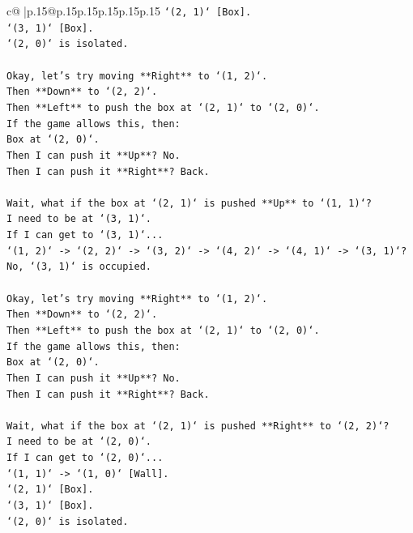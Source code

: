 \documentclass{article}
\begin{document}
{\begin{supertabular}{c@{$\;$}|p{.15\linewidth}@{}p{.15\linewidth}p{.15\linewidth}p{.15\linewidth}p{.15\linewidth}p{.15\linewidth}}
{{{\texttt{`(2, 1)` {[}Box{]}.} \\
\texttt{`(3, 1)` {[}Box{]}.} \\
\texttt{`(2, 0)` is isolated.} \\
\\ 
\texttt{Okay, let's try moving **Right** to `(1, 2)`.} \\
\texttt{Then **Down** to `(2, 2)`.} \\
\texttt{Then **Left** to push the box at `(2, 1)` to `(2, 0)`.} \\
\texttt{If the game allows this, then:} \\
\texttt{Box at `(2, 0)`.} \\
\texttt{Then I can push it **Up**? No.} \\
\texttt{Then I can push it **Right**? Back.} \\
\\ 
\texttt{Wait, what if the box at `(2, 1)` is pushed **Up** to `(1, 1)`?} \\
\texttt{I need to be at `(3, 1)`.} \\
\texttt{If I can get to `(3, 1)`...} \\
\texttt{`(1, 2)` {-}> `(2, 2)` {-}> `(3, 2)` {-}> `(4, 2)` {-}> `(4, 1)` {-}> `(3, 1)`? No, `(3, 1)` is occupied.} \\
\\ 
\texttt{Okay, let's try moving **Right** to `(1, 2)`.} \\
\texttt{Then **Down** to `(2, 2)`.} \\
\texttt{Then **Left** to push the box at `(2, 1)` to `(2, 0)`.} \\
\texttt{If the game allows this, then:} \\
\texttt{Box at `(2, 0)`.} \\
\texttt{Then I can push it **Up**? No.} \\
\texttt{Then I can push it **Right**? Back.} \\
\\ 
\texttt{Wait, what if the box at `(2, 1)` is pushed **Right** to `(2, 2)`?} \\
\texttt{I need to be at `(2, 0)`.} \\
\texttt{If I can get to `(2, 0)`...} \\
\texttt{`(1, 1)` {-}> `(1, 0)` {[}Wall{]}.} \\
\texttt{`(2, 1)` {[}Box{]}.} \\
\texttt{`(3, 1)` {[}Box{]}.} \\
\texttt{`(2, 0)` is isolated.} \\
}}}
\end{supertabular}}
\end{document}
